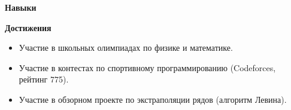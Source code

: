 \documentclass[a4paper,10pt]{article}
\begin{document}
\vspace{1cm}
{\bfseries \LARGE Навыки}\\

   
 

\vspace{1cm}
{\bfseries \LARGE Достижения}\\[5pt]

\begin{itemize}[nolistsep, itemsep=3pt]
    \item Участие в школьных олимпиадах по физике и математике.
    \item Участие в контестах по спортивному программированию (Codeforces, рейтинг 775).
    \item Участие в обзорном проекте по экстраполяции рядов (алгоритм Левина).
\end{itemize}
\end{document}
